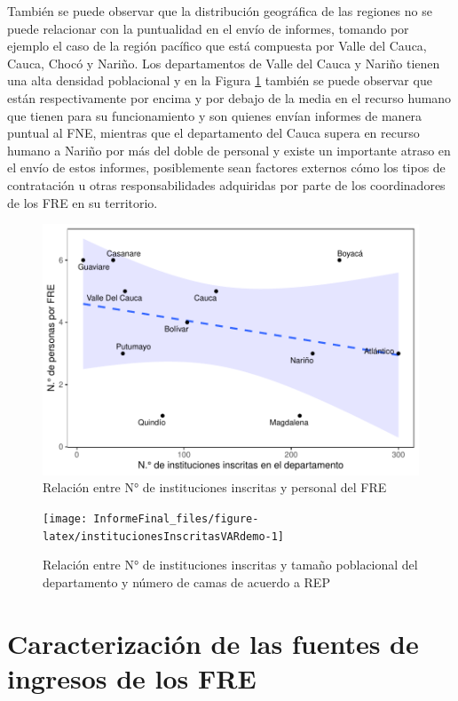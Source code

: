 \documentclass[
]{book}
\begin{document}
También se puede observar que la distribución geográfica de las regiones no se puede relacionar con la puntualidad en el envío de informes, tomando por ejemplo el caso de la región pacífico que está compuesta por Valle del Cauca, Cauca, Chocó y Nariño. Los departamentos de Valle del Cauca y Nariño tienen una alta densidad poblacional y en la Figura \ref{fig:institucionesInscritasRelacion} también se puede observar que están respectivamente por encima y por debajo de la media en el recurso humano que tienen para su funcionamiento y son quienes envían informes de manera puntual al FNE, mientras que el departamento del Cauca supera en recurso humano a Nariño por más del doble de personal y existe un importante atraso en el envío de estos informes, posiblemente sean factores externos cómo los tipos de contratación u otras responsabilidades adquiridas por parte de los coordinadores de los FRE en su territorio.

\begin{figure}
\includegraphics[width=0.85\linewidth]{InformeFinal_files/figure-latex/institucionesInscritasRelacion-1} \caption{Relación entre N° de instituciones inscritas y personal del FRE}\label{fig:institucionesInscritasRelacion}
\end{figure}

\begin{figure}
\texttt{[image: InformeFinal\_files/figure-latex/institucionesInscritasVARdemo-1]} \caption{Relación entre N° de instituciones inscritas y tamaño poblacional del departamento y número de camas de acuerdo a REP}\label{fig:institucionesInscritasVARdemo}
\end{figure}

\hypertarget{caracterizaciuxf3n-de-las-fuentes-de-ingresos-de-los-fre}{%
\section{Caracterización de las fuentes de ingresos de los FRE}\label{caracterizaciuxf3n-de-las-fuentes-de-ingresos-de-los-fre}}
\end{document}
